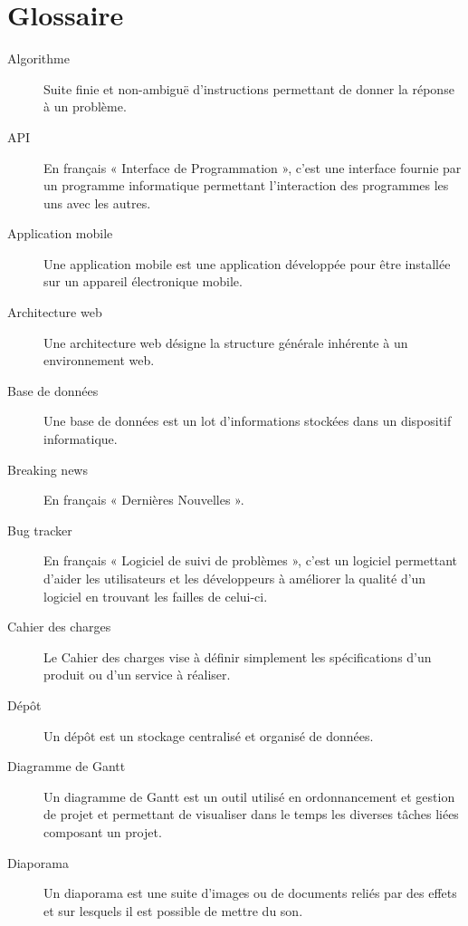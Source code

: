 \documentclass{life-fr}
\begin{document}
\newpage

\section{Glossaire}


\begin{description}
\item[Algorithme]
Suite finie et non-ambiguë d’instructions permettant de donner la réponse à un problème.
\item[API]
En français « Interface de Programmation », c'est une interface fournie par un programme informatique permettant l'interaction des programmes les uns avec les autres.

\item[Application mobile]
Une application mobile est une application développée pour être installée sur un appareil électronique mobile.

\item[Architecture web]
Une architecture web désigne la structure générale inhérente à un environnement web.

\item[Base de données]
Une base de données est un lot d'informations stockées dans un dispositif informatique.

\item[Breaking news]
En français « Dernières Nouvelles ».

\item[Bug tracker]
En français « Logiciel de suivi de problèmes », c'est un logiciel permettant d'aider les utilisateurs et les développeurs à améliorer la qualité d'un logiciel en trouvant les failles de celui-ci.

\item[Cahier des charges]
Le Cahier des charges vise à définir simplement les spécifications d’un produit ou d’un service à réaliser.

\item[Dépôt]
Un dépôt est un stockage centralisé et organisé de données.

\item[Diagramme de Gantt]
Un diagramme de Gantt est un outil utilisé en ordonnancement et gestion de projet et permettant de visualiser dans le temps les diverses tâches liées composant un projet.

\item[Diaporama]
Un diaporama est une suite d’images ou de documents reliés par des effets et sur lesquels il est possible de mettre du son.


\end{description}
\end{document}
